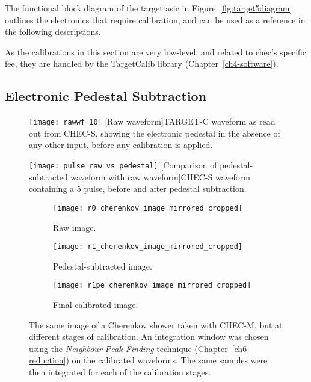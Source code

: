 The functional block diagram of the \gls{target} \gls{asic} in Figure~\ref{fig:target5diagram} outlines the electronics that require calibration, and can be used as a reference in the following descriptions.

As the calibrations in this section are very low-level, and related to \gls{chec}'s specific \gls{fee}, they are handled by the TargetCalib library (Chapter~\ref{ch4-software}).

\subsection{Electronic Pedestal Subtraction}

\begin{figure}
\begin{minipage}[t]{.49\textwidth}
  \centering
  \texttt{[image: rawwf\_10]} 
  [Raw waveform]{TARGET-C waveform as read out from CHEC-S, showing the electronic pedestal in the absence of any other input, before any calibration is applied.}
  \label{fig:rawwf}
\end{minipage}%
\hfill
\begin{minipage}[t]{.49\textwidth}
  \centering
  \texttt{[image: pulse\_raw\_vs\_pedestal]}
  [Comparison of pedestal-subtracted waveform with raw waveform]{CHEC-S waveform  containing a \SI{5}{\pe} pulse, before and after pedestal subtraction.}
  \label{fig:pulse_raw_vs_pedestal}
\end{minipage}
\end{figure}

\begin{figure}
  \begin{subfigure}[b]{0.49\textwidth}
    \texttt{[image: r0\_cherenkov\_image\_mirrored\_cropped]}
    \caption{Raw image.}
    \label{fig:r0_cherenkov_image_mirrored_cropped}
  \end{subfigure}
  \hfill
  \begin{subfigure}[b]{0.49\textwidth}
    \texttt{[image: r1\_cherenkov\_image\_mirrored\_cropped]}
    \caption{Pedestal-subtracted image.}
    \label{fig:r1_cherenkov_image_mirrored_cropped}
  \end{subfigure}
  \centering
  \begin{subfigure}[b]{0.49\textwidth}
    \texttt{[image: r1pe\_cherenkov\_image\_mirrored\_cropped]}
    \caption{Final calibrated image.}
    \label{fig:r1pe_cherenkov_image_mirrored_cropped}
  \end{subfigure}
  \caption[Comparison of calibration stages with a Cherenkov shower image.]{The same image of a Cherenkov shower taken with CHEC-M, but at different stages of calibration. An integration window was chosen using the \textit{Neighbour Peak Finding} technique (Chapter~\ref{ch6-reduction}) on the \si{\pe} calibrated waveforms. The same samples were then integrated for each of the calibration stages.}
\end{figure}


